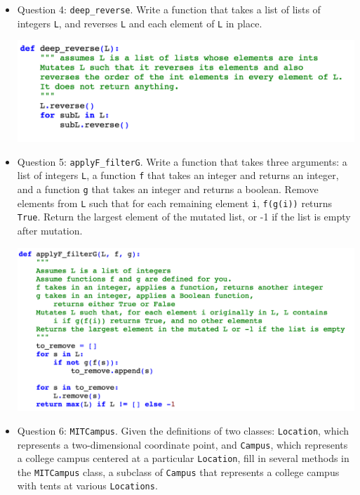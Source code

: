\begin{itemize}
\item Question 4: \texttt{deep\_reverse}. Write a function that takes a list of lists of integers \texttt{L}, and reverses \texttt{L} and each element of \texttt{L} in place.

\includegraphics[scale=0.65]{Body/figures/grovercode/fig_deep_reverse}

\item Question 5: \texttt{applyF\_filterG}. Write a function that takes three arguments: a list of integers \texttt{L}, a function \texttt{f} that takes an integer and returns an integer, and a function \texttt{g} that takes an integer and returns a boolean. Remove elements from \texttt{L} such that for each remaining element \texttt{i}, \texttt{f(g(i))} returns \texttt{True}. Return the largest element of the mutated list, or -1 if the list is empty after mutation.

\includegraphics[scale=0.65]{Body/figures/grovercode/fig_applyF_filterG}

\item Question 6: \texttt{MITCampus}. Given the definitions of two classes: \texttt{Location}, which represents a two-dimensional coordinate point, and \texttt{Campus}, which represents a college campus centered at a particular \texttt{Location}, fill in several methods in the \texttt{MITCampus} class, a subclass of \texttt{Campus} that represents a college campus with tents at various \texttt{Locations}.


\end{itemize}

